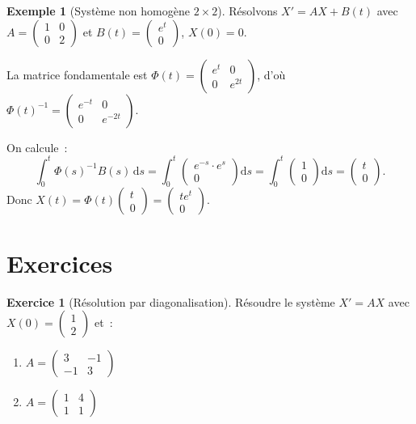 \documentclass[12pt,a4paper,openany]{book}
\theoremstyle{definition}
\newtheorem{exemple}[definition]{Exemple}
\newtheorem{exercice}{Exercice}[chapter]
\theoremstyle{plain}
\theoremstyle{remark}
\newcommand{\dd}{\mathrm{d}}
\begin{document}
\begin{exemple}[Système non homogène $2\times 2$]\label{ex:syst-non-homogene}
  Résolvons $X' = AX + B(t)$ avec
  $A = \begin{pmatrix} 1 & 0 \\ 0 & 2 \end{pmatrix}$ et
  $B(t) = \begin{pmatrix} e^t \\ 0 \end{pmatrix}$, $X(0) = 0$.

  La matrice fondamentale est $\Phi(t) = \begin{pmatrix} e^t & 0 \\ 0 & e^{2t} \end{pmatrix}$, d'où
  $\Phi(t)^{-1} = \begin{pmatrix} e^{-t} & 0 \\ 0 & e^{-2t} \end{pmatrix}$.

  On calcule~:
  \[
    \int_0^t \Phi(s)^{-1}B(s)\,\dd s
    = \int_0^t \begin{pmatrix} e^{-s} \cdot e^s \\ 0 \end{pmatrix}\dd s
    = \int_0^t \begin{pmatrix} 1 \\ 0 \end{pmatrix}\dd s
    = \begin{pmatrix} t \\ 0 \end{pmatrix}.
  \]
  Donc
  $X(t) = \Phi(t)\begin{pmatrix}t\\0\end{pmatrix}
  = \begin{pmatrix}te^t\\0\end{pmatrix}$.
\end{exemple}

\section{Exercices}\label{sec:exo-ch5}

\begin{exercice}[Résolution par diagonalisation]\label{exo:syst-diag}
  Résoudre le système $X' = AX$ avec $X(0) = \begin{pmatrix}1\\2\end{pmatrix}$ et~:
  \begin{enumerate}[label=\alph*)]
    \item $A = \begin{pmatrix} 3 & -1 \\ -1 & 3 \end{pmatrix}$
    \item $A = \begin{pmatrix} 1 & 4 \\ 1 & 1 \end{pmatrix}$
  \end{enumerate}
\end{exercice}
\end{document}
